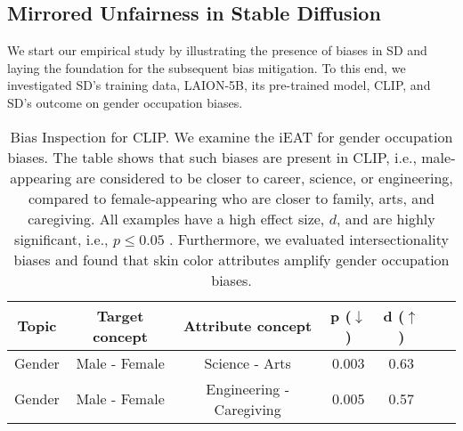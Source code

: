 \documentclass{article}%
\begin{document}
\subsection*{Mirrored Unfairness in Stable Diffusion}
We start our empirical study by illustrating the presence of biases in SD and laying the foundation for the subsequent bias mitigation. To this end, we investigated SD's training data, LAION-5B, its pre-trained model, CLIP, and SD's outcome on gender occupation biases.

\begin{table}[t]
        \centering
        \caption{Bias Inspection for CLIP. We examine the iEAT for gender occupation biases. The table shows that such biases are present in CLIP, i.e., male-appearing are considered to be closer to career, science, or engineering, compared to female-appearing who are closer to family, arts, and caregiving. All examples have a high effect size, $d$, and are highly significant, i.e., $p \leq 0.05$ . Furthermore, we evaluated intersectionality biases and found that skin color attributes amplify gender occupation biases.}
        \begin{tabular}{c|cccccc}
         Topic & Target concept & Attribute concept & p ($\pmb{\downarrow}$) & d ($\pmb{\uparrow}$) \\
         \hline
         Gender & Male - Female & Science - Arts & 0.003 & 0.63 \\
         Gender & Male - Female & Engineering - Caregiving & 0.005 & 0.57 \\

\end{tabular}
\end{table}
\end{document}
